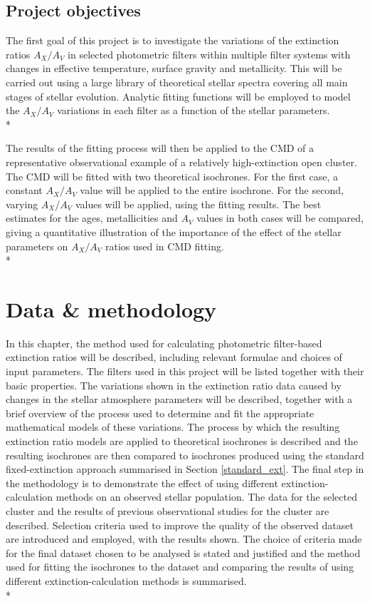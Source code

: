 \documentclass[12pt, a4paper]{report}
\begin{document}
\section{Project objectives}
The first goal of this project is to investigate the variations of the extinction ratios $A_{X}/A_{V}$ in selected photometric filters within multiple filter systems with changes in effective temperature, surface gravity and metallicity. This will be carried out using a large library of theoretical stellar spectra covering all main stages of stellar evolution. Analytic fitting functions will be employed to model the $A_{X}/A_{V}$ variations in each filter as a function of the stellar parameters. \\*

The results of the fitting process will then be applied to the CMD of a representative observational example of a relatively high-extinction open cluster. The CMD will be fitted with two theoretical isochrones. For the first case, a constant $A_{X}/A_{V}$ value will be applied to the entire isochrone. For the second, varying $A_{X}/A_{V}$ values will be applied, using the fitting results. The best estimates for the ages, metallicities and $A_{V}$ values in both cases will be compared, giving a quantitative illustration of the importance of the effect of the stellar parameters on $A_{X}/A_{V}$ ratios used in CMD fitting.\\*



\chapter{Data \& methodology}
In this chapter, the method used for calculating photometric filter-based extinction ratios will be described, including relevant formulae and choices of input parameters. The filters used in this project will be listed together with their basic properties. The variations shown in the extinction ratio data caused by changes in the stellar atmosphere parameters will be described, together with a brief overview of the process used to determine and fit the appropriate mathematical models of these variations. The process by which the resulting extinction ratio models are applied to theoretical isochrones is described and the resulting isochrones are then compared to isochrones produced using the standard fixed-extinction approach summarised in Section \ref{standard_ext}. The final step in the methodology is to demonstrate the effect of using different extinction-calculation methods on an observed stellar population. The data for the selected cluster and the results of previous observational studies for the cluster are described. Selection criteria used to improve the quality of the observed dataset are introduced and employed, with the results shown. The choice of criteria made for the final dataset chosen to be analysed is stated and justified and the method used for fitting the isochrones to the dataset and comparing the results of using different extinction-calculation methods is summarised.\\*
\end{document}
